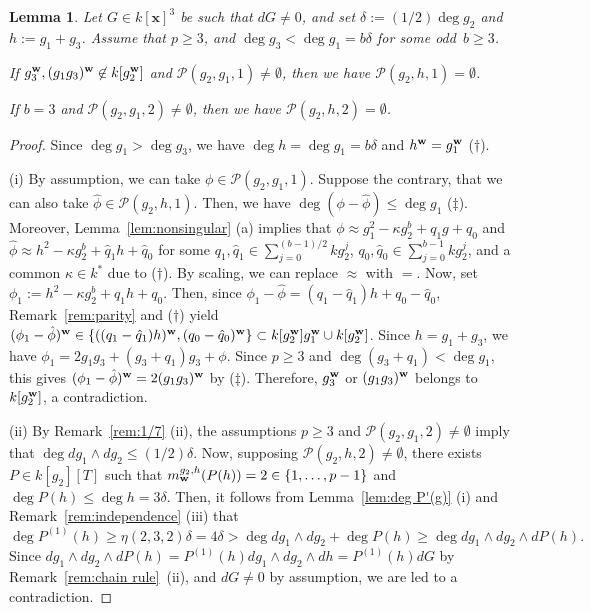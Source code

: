 \documentclass{amsart}
\theoremstyle{plain}
\newtheorem{lem}[thm]{Lemma}
\theoremstyle{definition}
\newcommand{\nd}{\noindent}
\newcommand{\x}{{\boldsymbol x}}
\newcommand{\w}{{\bf w}}
\newcommand{\kx}{k[\x]}
\begin{document}
\begin{lem}\label{prop:modification2}
Let $G\in \kx ^3$ be such that $dG\ne 0$, 
and set $\delta :=(1/2)\deg g_2$ and $h:=g_1+g_3$. 
Assume that $p\ge 3$, 
and $\deg g_3<\deg g_1=b\delta $ 
for some odd~$b\ge 3$. 


\nd{\rm (i)} 
If $g_3^{\w },(g_1g_3)^{\w }\not\in k[g_2^{\w }]$ 
and $\mathcal{P}(g_2,g_1,1)\ne \emptyset $, 
then we have $\mathcal{P}(g_2,h,1)=\emptyset $. 


\nd{\rm (ii)} 
If $b=3$ and $\mathcal{P}(g_2,g_1,2)\ne \emptyset $, 
then we have $\mathcal{P}(g_2,h,2)=\emptyset $. 

\end{lem}
\begin{proof}
Since $\deg g_1>\deg g_3$, 
we have $\deg h=\deg g_1=b\delta $ 
and $h^{\w }=g_1^{\w }$ ($\dag $). 



(i) 
By assumption, 
we can take $\phi \in \mathcal{P}(g_2,g_1,1)$. 
Suppose the contrary, 
that we can also take 
$\hat{\phi }\in \mathcal{P}(g_2,h,1)$. 
Then, 
we have $\deg (\phi -\hat{\phi })\le \deg g_1$ ($\ddag $). 
Moreover, 
Lemma~\ref{lem:nonsingular} (a) implies that 
$\phi \approx g_1^2-\kappa g_2^b+q_{1}g+q_{0}$ 
and $\hat{\phi }\approx h^2-\kappa g_2^b+\hat{q}_{1}h+\hat{q}_{0}$ 
for some 
$q_{1},\hat{q}_{1}\in \sum _{j=0}^{(b-1)/2}kg_2^j$, 
$q_{0},\hat{q}_{0}\in \sum _{j=0}^{b-1}kg_2^j$, 
and a common 
$\kappa \in k^*$ due to ($\dag $). 
By scaling, 
we can replace $\approx $ with $=$. 
Now, 
set $\phi _1 :=h^2-\kappa g_2^b+q_{1}h+q_{0}$. 
Then, 
since $\phi _1 -\hat{\phi }=(q_{1}-\hat{q}_{1})h+q_{0}-\hat{q}_{0}$, 
Remark~\ref{rem:parity} and ($\dag $) yield 
$(\phi _1 -\hat{\phi })^{\w }
\in \{ ((q_{1}-\hat{q}_{1})h)^{\w },(q_{0}-\hat{q}_{0})^{\w }\} 
\subset k[g_2^{\w }]g_1^{\w }\cup k[g_2^{\w }]$. 
Since $h=g_1+g_3$, 
we have $\phi _1=2g_1g_3+(g_3+q_{1})g_3+\phi $. 
Since $p\ge 3$ and 
$\deg (g_3+q_{1})<\deg g_1$, 
this gives $(\phi _1 -\hat{\phi })^{\w }=2(g_1g_3)^{\w }$ 
by ($\ddag $). 
Therefore, $g_3^{\w }$ or $(g_1g_3)^{\w }$ 
belongs to $k[g_2^{\w }]$, 
a contradiction. 



(ii) 
By Remark~\ref{rem:1/7} (ii), 
the assumptions 
$p\ge 3$ and $\mathcal{P}(g_2,g_1,2)\ne \emptyset $ 
imply that $\deg dg_1\wedge dg_2\le (1/2)\delta $. 
Now, 
supposing $\mathcal{P}(g_2,h,2)\ne \emptyset $, 
there exists $P\in k[g_2][T]$ such that 
$m_{\w }^{g_2,h}(P(h))=2\in \{ 1,\ldots ,p-1\} $
and $\deg P(h)\le \deg h=3\delta $. 
Then, 
it follows from 
Lemma~\ref{lem:deg P'(g)} (i) 
and Remark~\ref{rem:independence} (iii) 
that 
$$
\deg P^{(1)}(h)\ge \eta (2,3,2)\delta =4\delta 
>\deg dg_1\wedge dg_2+\deg P(h)
\ge \deg dg_1\wedge dg_2\wedge dP(h). 
$$ 
Since $dg_1\wedge dg_2\wedge dP(h)
=P^{(1)}(h)dg_1\wedge dg_2\wedge dh=P^{(1)}(h)dG$ 
by Remark~\ref{rem:chain rule}~(ii), 
and $dG\ne 0$ by assumption, 
we are led to a contradiction. 
\end{proof}
\end{document}
